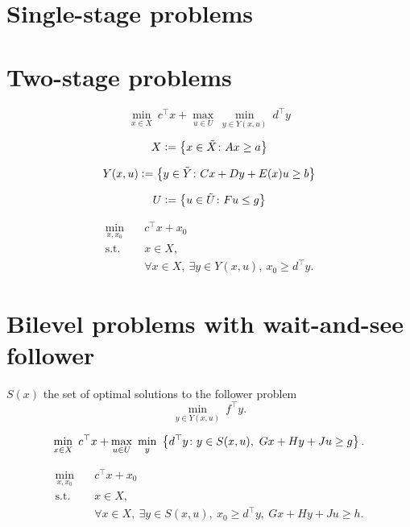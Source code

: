 \section{Single-stage problems}

\section{Two-stage problems}

\begin{equation*}
    \min_{x\in X} \ c^\top x + \max_{ u\in U } \ \min_{y\in Y(x,u)} \ d^\top y
\end{equation*}

\begin{equation*}
    X \mathrel{{\mathop:}{=}} \left\{ x\in \tilde{X} \colon Ax \ge a \right\}
\end{equation*}

\begin{equation*}
    Y(x,u) \mathrel{{\mathop:}{=}} \left\{ y\in \tilde{Y} \colon Cx + Dy + E(x)u \ge b \right\}
\end{equation*}

\begin{equation*}
    U \mathrel{{\mathop:}{=}} \left\{ u\in\tilde{U} \colon Fu \le g \right\}
\end{equation*}

\begin{subequations}
    \begin{align*}
        \min_{x,x_0} \quad & c^\top x + x_0 \\
        \text{s.t.} \quad & x\in X, \\
        & \forall x\in X, \ \exists y\in Y(x,u), \ x_0 \ge d^\top y.
    \end{align*}
\end{subequations}

\section{Bilevel problems with wait-and-see follower}

$S(x)$ the set of optimal solutions to the follower problem
\begin{equation*}
    \min_{y\in Y(x,u)} \ f^\top y.
\end{equation*}

\begin{equation*}
    \min_{x\in X} \ c^\top x + \max_{ u\in U } \ \min_{y} \ \left\{ d^\top y \colon y\in S(x,u), \ Gx + Hy + Ju \ge g \right\}.
\end{equation*}

\begin{subequations}
    \begin{align*}
        \min_{x,x_0} \quad & c^\top x + x_0 \\
        \text{s.t.} \quad & x\in X, \\
        & \forall x\in X, \ \exists y\in S(x,u), \ x_0 \ge d^\top y, \ Gx + Hy + Ju \ge h.
    \end{align*}
\end{subequations}
